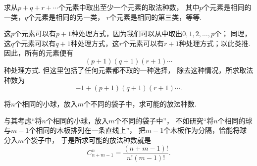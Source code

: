 \begin{example}
求从\(p+q+r+\dotsb\)个元素中取出至少一个元素的取法种数，
其中\(p\)个元素是相同的一类，\(q\)个元素是相同的另一类，
\(r\)个元素是相同的第三类，等等.
\begin{solution}
这\(p\)个元素可以有\(p+1\)种处理方式，因为我们可以从中取出\(0,1,2,\dotsc,p\)个；
同理，这\(q\)个元素可以有\(q+1\)种处理方式，这\(r\)个元素可以有\(r+1\)种处理方式；以此类推.
因此，所有的元素便有\begin{equation*}
	(p+1)(q+1)(r+1)\dotsm
\end{equation*}种处理方式.
但这里包括了任何元素都不取的一种选择，
除去这种情况，所求取法种数为\begin{equation*}
	-1+(p+1)(q+1)(r+1)\dotsm.
\end{equation*}
\end{solution}
\end{example}


\begin{example}
将\(n\)个相同的小球，放入\(m\)个不同的袋子中，求可能的放法种数.
\begin{solution}
与其考虑“将\(n\)个相同的小球，放入\(m\)个不同的袋子中”，
不如研究“将\(n\)个相同的球与\(m-1\)个相同的木板排列在一条直线上”，
把\(m-1\)个木板作为分隔，恰能将球分入\(m\)个袋子中，
于是所求可能的放法种数就是\begin{equation*}
	C_{n+m-1}^n
	= \frac{
		(n + m-1)!
	}{
		n! (m-1)!
	}.
\end{equation*}
\end{solution}
\end{example}

